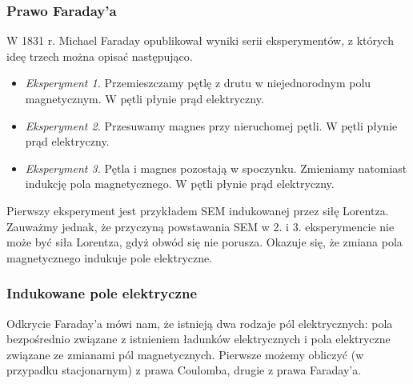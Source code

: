 \documentclass[../main.tex]{subfiles}
\begin{document}
    \subsubsection*{Prawo Faraday'a}
    W 1831 r. Michael Faraday opublikował wyniki serii eksperymentów, z których ideę trzech można
    opisać następująco.
    \begin{itemize}
        \item \textit{Eksperyment 1.} Przemieszczamy pętlę z drutu w niejednorodnym polu
        magnetycznym. W pętli płynie prąd elektryczny.
        \item \textit{Eksperyment 2.} Przesuwamy magnes przy nieruchomej pętli. W pętli płynie prąd
        elektryczny.
        \item \textit{Eksperyment 3.} Pętla i magnes pozostają w spoczynku. Zmieniamy natomiast
        indukcję pola magnetycznego. W pętli płynie prąd elektryczny.
    \end{itemize}
    Pierwszy eksperyment jest przykładem SEM indukowanej przez siłę Lorentza. Zauważmy jednak, że
    przyczyną powstawania SEM w 2. i 3. eksperymencie nie może być siła Lorentza, gdyż obwód się nie
    porusza. Okazuje się, że zmiana pola magnetycznego indukuje pole elektryczne.
    \medskip
    
    \noindent{}
\medskip

\noindent{}

\subsubsection*{Indukowane pole elektryczne}
Odkrycie Faraday'a mówi nam, że istnieją dwa rodzaje pól elektrycznych: pola bezpośrednio związane z
istnieniem ładunków elektrycznych i pola elektryczne związane ze zmianami pól magnetycznych.
Pierwsze możemy obliczyć (w przypadku stacjonarnym) z prawa Coulomba, drugie z prawa Faraday'a.
\end{document}
